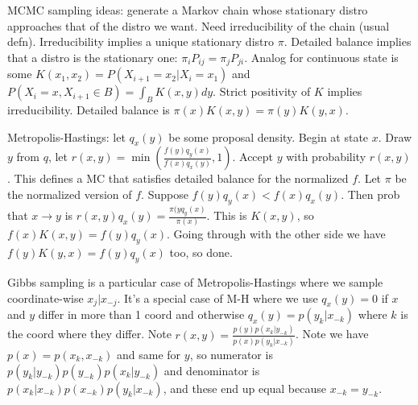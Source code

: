 \documentclass{article}
\begin{document}
MCMC sampling ideas: generate a Markov chain whose stationary distro approaches that of the distro we want. Need irreducibility of the chain (usual defn). Irreducibility implies a unique stationary distro $\pi$. Detailed balance implies that a distro is the stationary one: $\pi_iP_{ij}=\pi_jP_{ji}$. Analog for continuous state is some $K(x_1,x_2)=P(X_{i+1}=x_2|X_i=x_1)$ and $P(X_i=x,X_{i+1}\in B)=\int_B K(x,y)dy$. Strict positivity of $K$ implies irreducibility. Detailed balance is $\pi(x)K(x,y)=\pi(y)K(y,x)$. 

Metropolis-Hastings: let $q_x(y)$ be some proposal density. Begin at state $x$. Draw $y$ from $q$, let $r(x,y)=\min\left(\frac{f(y)q_y(x)}{f(x)q_x(y)},1\right)$. Accept $y$ with probability $r(x,y)$. This defines a MC that satisfies detailed balance for the normalized $f$. Let $\pi$ be the normalized version of $f$. Suppose $f(y)q_y(x)<f(x)q_x(y)$. Then prob that $x\to y$ is $r(x,y)q_x(y)=\frac{\pi(yq_y(x)}{\pi(x)}$. This is $K(x,y)$, so $f(x)K(x,y)=f(y)q_y(x)$. Going through with the other side we have $f(y)K(y,x)=f(y)q_y(x)$ too, so done.

Gibbs sampling is a particular case of Metropolis-Hastings where we sample coordinate-wise $x_j|x_{-j}$. It's a special case of M-H where we use $q_x(y)=0$ if $x$ and $y$ differ in more than 1 coord and otherwise $q_x(y)=p(y_k|x_{-k})$ where $k$ is the coord where they differ. Note $r(x,y)=\frac{p(y)p(x_k|y_{-k})}{p(x)p(y_k|x_{-k})}$. Note we have $p(x)=p(x_k,x_{-k})$ and same for $y$, so numerator is $p(y_k|y_{-k})p(y_{-k})p(x_k|y_{-k})$ and denominator is $p(x_k|x_{-k})p(x_{-k})p(y_k|x_{-k})$, and these end up equal because $x_{-k}=y_{-k}$.
\end{document}
